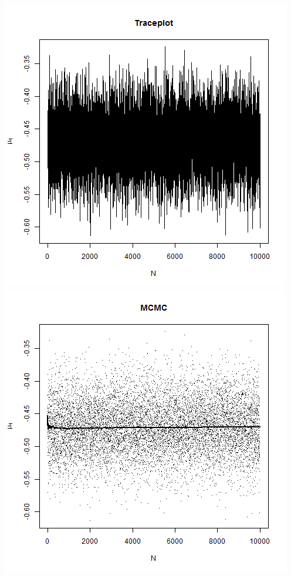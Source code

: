 \documentclass{article}
\begin{document}
\begin{enumerate}
\includegraphics[scale = 0.4]{MU1plot.png}
\includegraphics[scale = 0.4]{MU1MCMC.png}\\

\end{enumerate}
\end{document}

